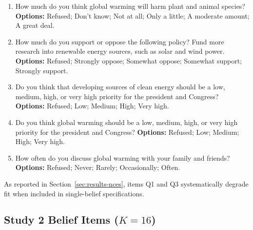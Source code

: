 \documentclass[12pt]{article}
\begin{document}
\begin{enumerate}[label=Q\arabic*., leftmargin=*]
    \item How much do you think global warming will harm plant and animal species? \\
    \textbf{Options:} Refused; Don’t know; Not at all; Only a little; A moderate amount; A great deal.
    \item How much do you support or oppose the following policy? Fund more research into renewable energy sources, such as solar and wind power. \\
    \textbf{Options:} Refused; Strongly oppose; Somewhat oppose; Somewhat support; Strongly support.
    \item Do you think that developing sources of clean energy should be a low, medium, high, or very high priority for the president and Congress?\\
    \textbf{Options:} Refused; Low; Medium; High; Very high.
    \item Do you think global warming should be a low, medium, high, or very high priority for the president and Congress?
    \textbf{Options:} Refused; Low; Medium; High; Very high.
    \item How often do you discuss global warming with your family and friends? \\
    \textbf{Options:} Refused; Never; Rarely; Occasionally; Often.
\end{enumerate}

\noindent As reported in Section~\ref{sec:results-nces}, items Q1 and Q3 systematically degrade fit when included in single-belief specifications. 

\subsection{Study 2 Belief Items ($K = 16$)}
\end{document}
